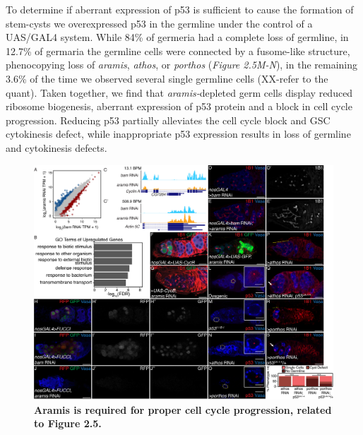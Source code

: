 \documentclass[12pt,oneside]{reedthesis}
\begin{document}
To determine if aberrant expression of p53 is sufficient to cause the formation of stem-cysts we overexpressed p53 in the germline under the control of a UAS/GAL4 system. While 84\% of germeria had a complete loss of germline, in 12.7\% of germaria the germline cells were connected by a fusome-like structure, phenocopying loss of \emph{aramis}, \emph{athos}, or \emph{porthos} (\emph{Figure 2.5M-N}), in the remaining 3.6\% of the time we observed several single germline cells (XX-refer to the quant). Taken together, we find that \emph{aramis-}depleted germ cells display reduced ribosome biogenesis, aberrant expression of p53 protein and a block in cell cycle progression. Reducing p53 partially alleviates the cell cycle block and GSC cytokinesis defect, while inappropriate p53 expression results in loss of germline and cytokinesis defects.
\begin{figure}

{\centering \includegraphics[width=7 in,height=5.409091 in]{./figure/Ribosome Biogenesis/Ribosome Biogenesis 3S} 

}

\caption[\textbf{Aramis is required for proper cell cycle progression, related to Figure 2.5.}]{\textbf{Aramis is required for proper cell cycle progression, related to Figure 2.5.}}\label{fig:unnamed-chunk-11}
\end{figure}
\end{document}

